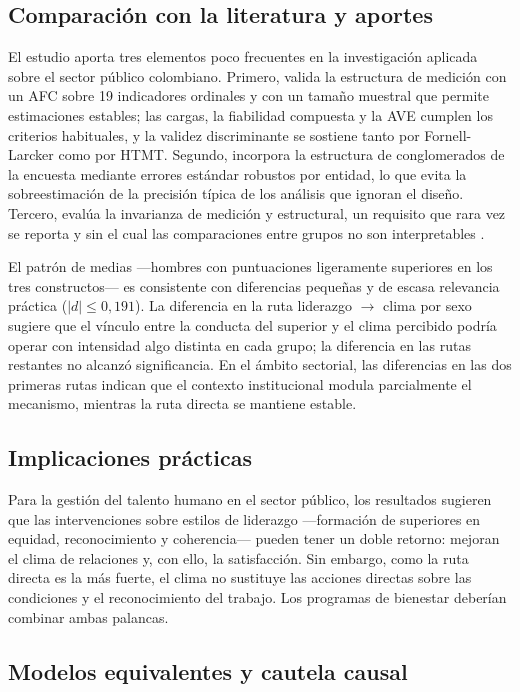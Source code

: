 \documentclass[11pt,a4paper]{article}
\begin{document}
\subsection{Comparación con la literatura y aportes}

El estudio aporta tres elementos poco frecuentes en la investigación aplicada sobre el sector
público colombiano. Primero, valida la estructura de medición con un AFC sobre 19 indicadores
ordinales y con un tamaño muestral que permite estimaciones estables; las cargas, la
fiabilidad compuesta y la AVE cumplen los criterios habituales, y la validez discriminante
se sostiene tanto por Fornell-Larcker como por HTMT. Segundo, incorpora la estructura de
conglomerados de la encuesta mediante errores estándar robustos por entidad, lo que evita la
sobreestimación de la precisión típica de los análisis que ignoran el diseño. Tercero, evalúa
la invarianza de medición y estructural, un requisito que rara vez se reporta y sin el cual
las comparaciones entre grupos no son interpretables \citep{putnick2016}.

El patrón de medias —hombres con puntuaciones ligeramente superiores en los tres
constructos— es consistente con diferencias pequeñas y de escasa relevancia práctica
($|d| \leq 0,191$). La diferencia en la ruta liderazgo $\rightarrow$ clima por sexo sugiere
que el vínculo entre la conducta del superior y el clima percibido podría operar con
intensidad algo distinta en cada grupo; la diferencia en las rutas restantes no alcanzó
significancia. En el ámbito sectorial, las diferencias en las dos primeras rutas indican que
el contexto institucional modula parcialmente el mecanismo, mientras la ruta directa se
mantiene estable.

\subsection{Implicaciones prácticas}

Para la gestión del talento humano en el sector público, los resultados sugieren que las
intervenciones sobre estilos de liderazgo —formación de superiores en equidad, reconocimiento
y coherencia— pueden tener un doble retorno: mejoran el clima de relaciones y, con ello, la
satisfacción. Sin embargo, como la ruta directa es la más fuerte, el clima no sustituye las
acciones directas sobre las condiciones y el reconocimiento del trabajo. Los programas de
bienestar deberían combinar ambas palancas.

\subsection{Modelos equivalentes y cautela causal}
\end{document}
